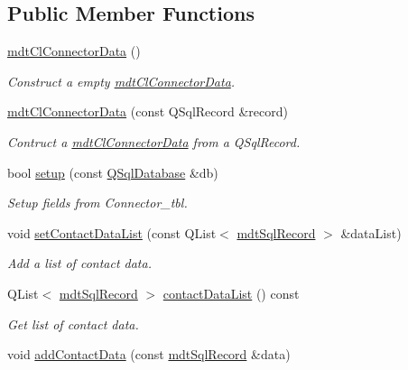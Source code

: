 \subsection*{Public Member Functions}
\begin{DoxyCompactItemize}
\item 
\hyperlink{classmdt_cl_connector_data_a69e30904bf05ecb44183ee5fc66aa377}{mdt\-Cl\-Connector\-Data} ()
\begin{DoxyCompactList}\small\item\em Construct a empty \hyperlink{classmdt_cl_connector_data}{mdt\-Cl\-Connector\-Data}. \end{DoxyCompactList}\item 
\hyperlink{classmdt_cl_connector_data_a48a9a7bdef4b641083055336672d0862}{mdt\-Cl\-Connector\-Data} (const Q\-Sql\-Record \&record)
\begin{DoxyCompactList}\small\item\em Contruct a \hyperlink{classmdt_cl_connector_data}{mdt\-Cl\-Connector\-Data} from a Q\-Sql\-Record. \end{DoxyCompactList}\item 
bool \hyperlink{classmdt_cl_connector_data_a0b198ee358c5abf389b0fac77e7ab732}{setup} (const \hyperlink{class_q_sql_database}{Q\-Sql\-Database} \&db)
\begin{DoxyCompactList}\small\item\em Setup fields from Connector\-\_\-tbl. \end{DoxyCompactList}\item 
void \hyperlink{classmdt_cl_connector_data_a1a3f7803aa42908fb80b30a6554ef2b8}{set\-Contact\-Data\-List} (const Q\-List$<$ \hyperlink{classmdt_sql_record}{mdt\-Sql\-Record} $>$ \&data\-List)
\begin{DoxyCompactList}\small\item\em Add a list of contact data. \end{DoxyCompactList}\item 
Q\-List$<$ \hyperlink{classmdt_sql_record}{mdt\-Sql\-Record} $>$ \hyperlink{classmdt_cl_connector_data_ac7a6caf92298a5520731a60f14c8f4c6}{contact\-Data\-List} () const 
\begin{DoxyCompactList}\small\item\em Get list of contact data. \end{DoxyCompactList}\item 
void \hyperlink{classmdt_cl_connector_data_ad8d4fcc7b07e80fa596e4c803b32e8ce}{add\-Contact\-Data} (const \hyperlink{classmdt_sql_record}{mdt\-Sql\-Record} \&data)

\end{DoxyCompactItemize}
